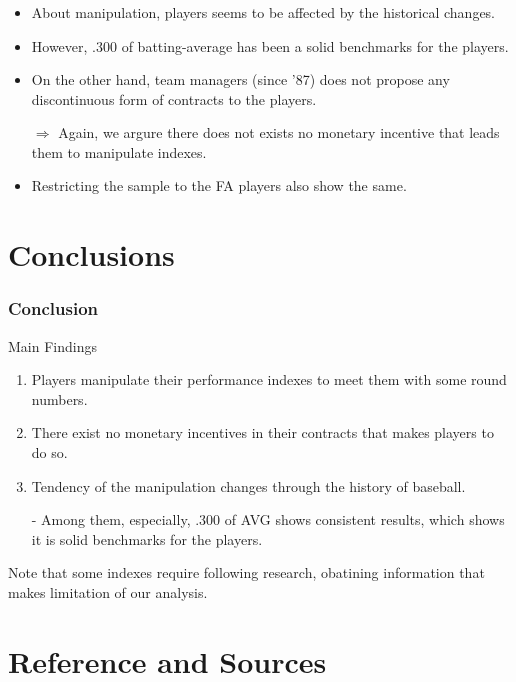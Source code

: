\documentclass[dvipdfmx,12pt]{beamer}
\begin{document}
\begin{frame}\frametitle{}
  \begin{itemize}
    \item About manipulation, players seems to be affected by the historical changes.

    \item However, .300 of batting-average has been a solid benchmarks for the players.

    \item On the other hand, team managers (since '87) does not propose any discontinuous form of contracts to the players.

    $\Rightarrow$ Again, we argure there does not exists no monetary incentive that leads them to manipulate indexes.

    \item Restricting the sample to the FA players also show the same.
  \end{itemize}
\end{frame}

\section{Conclusions}
\begin{frame}\frametitle{Conclusion}
  Main Findings
  \begin{enumerate}
    \item Players manipulate their performance indexes to meet them with some round numbers.

    \item There exist no monetary incentives in their contracts that makes players to do so.

    \item Tendency of the manipulation changes through the history of baseball.

    - Among them, especially, .300 of AVG shows consistent results, which shows it is solid benchmarks for the players.
  \end{enumerate}

  Note that some indexes require following research, obatining information that makes limitation of our analysis.
\end{frame}

\section*{Reference and Sources}
\end{document}
